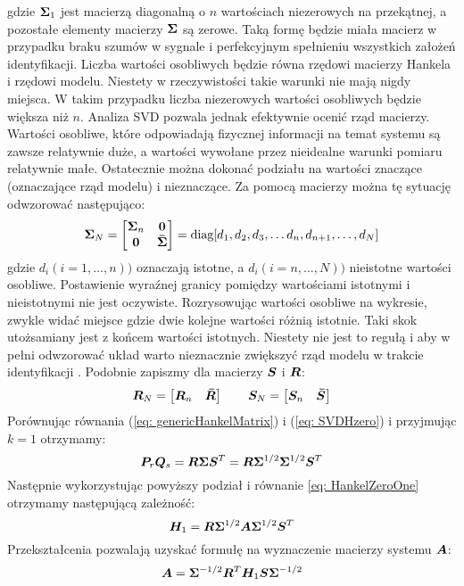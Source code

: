 gdzie $\bm{\Sigma}_1$ jest macierzą diagonalną o $n$ wartościach niezerowych na przekątnej, a pozostałe elementy macierzy $\bm{\Sigma}$ są zerowe. Taką formę będzie miała macierz w przypadku braku szumów w sygnale i perfekcyjnym spełnieniu wszystkich założeń identyfikacji. Liczba wartości osobliwych będzie równa rzędowi macierzy Hankela i rzędowi modelu. Niestety w rzeczywistości takie warunki nie mają nigdy miejsca. W takim przypadku liczba niezerowych wartości osobliwych będzie większa niż $n$. Analiza SVD pozwala jednak efektywnie ocenić rząd macierzy. Wartości osobliwe, które odpowiadają fizycznej informacji na temat systemu są zawsze relatywnie duże, a wartości wywołane przez nieidealne warunki pomiaru relatywnie małe. Ostatecznie można dokonać podziału na wartości znaczące (oznaczające rząd modelu) i nieznaczące. Za pomocą macierzy można tę sytuację odwzorować następująco:
\begin{equation}
	\bm{\Sigma}_N = \begin{bmatrix}
		\bm{\Sigma}_n & \bm{0} \\
		\bm{0} & \bm{\bar{\Sigma}}
	\end{bmatrix} = \text{diag}[d_1,d_2,d_3,\dots d_n,d_{n+1},\dots,d_N]
\end{equation}
gdzie $d_i(i=1,\dots,n)) $ oznaczają istotne, a $d_i(i=n,\dots,N))$ nieistotne wartości osobliwe. Postawienie wyraźnej granicy pomiędzy wartościami istotnymi i nieistotnymi nie jest oczywiste. Rozrysowując wartości osobliwe na wykresie, zwykle widać miejsce gdzie dwie kolejne wartości różnią istotnie. Taki skok utożsamiany jest z końcem wartości istotnych. Niestety nie jest to regułą i aby w pełni odwzorować układ warto nieznacznie zwiększyć rząd modelu w trakcie identyfikacji \parencite{Szafranski2013,Hollkamp2001}. Podobnie zapiszmy dla macierzy $\bm{S}$ i $\bm{R}$:
\begin{equation}
	\bm{R}_N = \begin{bmatrix}
		\bm{R}_n & \bm{\bar{R}} 
	\end{bmatrix} 
	\qquad 
	\bm{S}_N = \begin{bmatrix}
		\bm{S}_n & \bm{\bar{S}} 
	\end{bmatrix}
\end{equation}
Porównując równania (\ref{eq: genericHankelMatrix}) i (\ref{eq: SVDHzero}) i przyjmując $k=1$ otrzymamy:
\begin{equation} 
	\bm{P}_r\bm{Q}_s=\bm{R}\bm{\Sigma} \bm{S}^T = \bm{R}\bm{\Sigma}^{1/2}\bm{\Sigma}^{1/2} \bm{S}^T
\end{equation}
Następnie wykorzystując powyższy podział i równanie \ref{eq: HankelZeroOne} otrzymamy następującą zależność:
\begin{equation} 
	\bm{H}_1 =\bm{R}\bm{\Sigma}^{1/2}\bm{A}\bm{\Sigma}^{1/2} \bm{S}^T
\end{equation}
Przekształcenia pozwalają uzyskać formułę na wyznaczenie macierzy systemu $\bm{A}$:
\begin{equation} 
	\bm{A} =\bm{\Sigma}^{-1/2}\bm{R}^T\bm{H}_1\bm{S}\bm{\Sigma}^{-1/2}
\end{equation}

